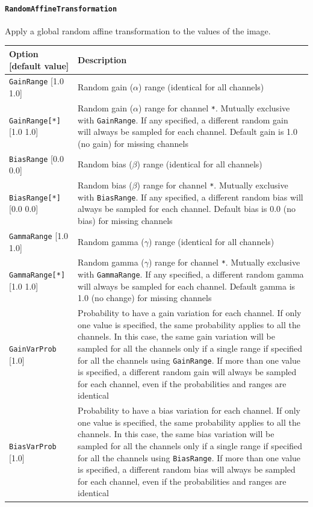 \documentclass[a4paper,11pt,oneside]{article}
\newcommand{\iponly}{\reversemarginpar
    \marginnote{\color{listletiblue}\normalfont\scriptsize
    {\ttfamily{}\hyperref[sec:N2D2-IP]{\color{listletiblue}N2D2 IP}} \emph{only}}}
\begin{document}
\paragraph{\texorpdfstring{%
\lstinline[basicstyle=\ttfamily\bfseries]!RandomAffineTransformation!%
\protect\iponly}{RandomAffineTransformation}}
Apply a global random affine transformation to the values of the image.

\begin{center}
 \begin{tabular}{| p{5cm} | p{10cm} | }
 \hline
 Option [default value] & Description\\
 \hline\hline
  \lstinline!GainRange! [1.0 1.0] & Random gain ($\alpha$) range (identical for all channels) \\
  \lstinline!GainRange[*]! [1.0 1.0] & Random gain ($\alpha$) range for channel \lstinline!*!. Mutually exclusive with \lstinline!GainRange!. If any specified, a different random gain will always be sampled for each channel. Default gain is 1.0 (no gain) for missing channels \\
  \lstinline!BiasRange! [0.0 0.0] & Random bias ($\beta$) range (identical for all channels) \\
  \lstinline!BiasRange[*]! [0.0 0.0] & Random bias ($\beta$) range for channel \lstinline!*!. Mutually exclusive with \lstinline!BiasRange!. If any specified, a different random bias will always be sampled for each channel. Default bias is 0.0 (no bias) for missing channels \\
  \lstinline!GammaRange! [1.0 1.0] & Random gamma ($\gamma$) range (identical for all channels) \\
  \lstinline!GammaRange[*]! [1.0 1.0] & Random gamma ($\gamma$) range for channel \lstinline!*!. Mutually exclusive with \lstinline!GammaRange!. If any specified, a different random gamma will always be sampled for each channel. Default gamma is 1.0 (no change) for missing channels \\
  \lstinline!GainVarProb! [1.0] & Probability to have a gain variation for each channel. If only one value is specified, the same probability applies to all the channels. In this case, the same gain variation will be sampled for all the channels only if a single range if specified for all the channels using \lstinline!GainRange!. If more than one value is specified, a different random gain will always be sampled for each channel, even if the probabilities and ranges are identical \\
  \lstinline!BiasVarProb! [1.0] & Probability to have a bias variation for each channel. If only one value is specified, the same probability applies to all the channels. In this case, the same bias variation will be sampled for all the channels only if a single range if specified for all the channels using \lstinline!BiasRange!. If more than one value is specified, a different random bias will always be sampled for each channel, even if the probabilities and ranges are identical \\

\end{tabular}
\end{center}
\end{document}
